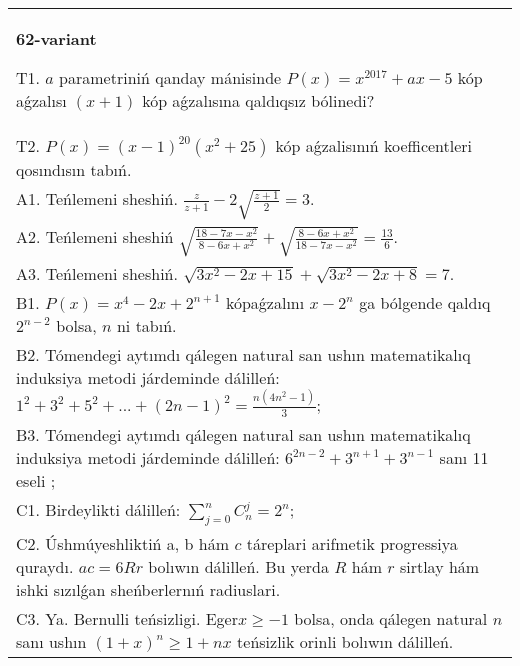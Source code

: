 \documentclass{article}
\begin{document}
\begin{tabular}{m{17cm}}
\textbf{62-variant}
\newline

T1. \(a\) parametriniń qanday mánisinde \(P(x) = x^{2017} + ax - 5\) kóp aǵzalısı \((x + 1)\) kóp aǵzalısına qaldıqsız bólinedi? \\
T2. \(P(x) = (x - 1)^{20}\left( x^{2} + 25 \right)\) kóp aǵzalisınıń koefficentleri qosındısın tabıń. \\
A1. Teńlemeni sheshiń. \(\frac{z}{z + 1} - 2\sqrt{\frac{z + 1}{2}} = 3\). \\
A2. Teńlemeni sheshiń \(\sqrt{\frac{18 - 7x - x^{2}}{8 - 6x + x^{2}}} + \sqrt{\frac{8 - 6x + x^{2}}{18 - 7x - x^{2}}} = \frac{13}{6}\). \\
A3. Teńlemeni sheshiń. \(\sqrt{3x^{2} - 2x + 15} + \sqrt{3x^{2} - 2x + 8} = 7\). \\
B1. \(P(x) = x^{4} - 2x + 2^{n + 1}\) kópaǵzalını \(x - 2^{n}\) ga bólgende qaldıq \(2^{n - 2}\) bolsa, \(n\) ni tabıń. \\
B2. Tómendegi aytımdı qálegen natural san ushın matematikalıq induksiya metodi járdeminde dálilleń: \(1^{2} + 3^{2} + 5^{2} + ... + (2n - 1)^{2} = \frac{n\left( 4n^{2} - 1 \right)}{3}\); \\
B3. Tómendegi aytımdı qálegen natural san ushın matematikalıq induksiya metodi járdeminde dálilleń: \(6^{2n - 2} + 3^{n + 1} + 3^{n - 1}\) sanı 11 eseli ; \\
C1. Birdeylikti dálilleń: \(\sum_{j = 0}^{n}C_{n}^{j} = 2^{n}\); \\
C2. Úshmúyeshliktiń a, b hám \(c\) táreplari arifmetik progressiya quraydı. \(ac = 6Rr\) bolıwın dálilleń. Bu yerda \(R\) hám \(r\) sirtlay hám ishki sızılǵan sheńberlernıń radiuslari. \\
C3. Ya. Bernulli teńsizligi. Eger\(x \geq - 1\) bolsa, onda qálegen natural \(n\) sanı ushın \((1 + x)^{n} \geq 1 + nx\) teńsizlik orinli bolıwın dálilleń. \\

\end{tabular}
\vspace{1cm}
\end{document}
